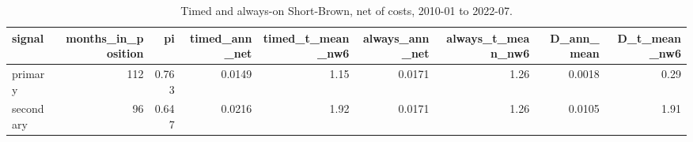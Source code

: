 \begin{table}[htbp]\centering\small
\caption{Timed and always-on Short-Brown, net of costs, 2010-01 to 2022-07.}
\label{tab:m8_summary}
\begin{tabular}{lrrrrrrrr}
\toprule
signal & months\_in\_position & pi & timed\_ann\_net & timed\_t\_mean\_nw6 & always\_ann\_net & always\_t\_mean\_nw6 & D\_ann\_mean & D\_t\_mean\_nw6 \\
\midrule
primary & 112 & 0.763 & 0.0149 & 1.15 & 0.0171 & 1.26 & 0.0018 & 0.29 \\
secondary & 96 & 0.647 & 0.0216 & 1.92 & 0.0171 & 1.26 & 0.0105 & 1.91 \\
\bottomrule
\end{tabular}
\end{table}
